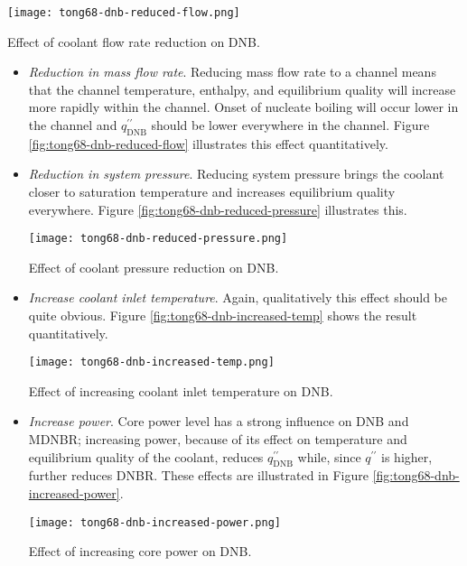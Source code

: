 \begin{marginfigure}
\texttt{[image: tong68-dnb-reduced-flow.png]}
\caption{Effect of coolant flow rate reduction on DNB.}
\label{fig:tong68-dnb-reduced-flow}
\end{marginfigure}
\begin{itemize}
\item \emph{Reduction in mass flow rate}.  Reducing mass flow rate to a channel means that the channel temperature, enthalpy, and equilibrium quality will increase more rapidly within the channel.  Onset of nucleate boiling will occur lower in the channel and $q^{\prime \prime}_{\text{DNB}}$ should be lower everywhere in the channel.  Figure \ref{fig:tong68-dnb-reduced-flow} illustrates this effect quantitatively.

\item \emph{Reduction in system pressure}.  Reducing system pressure brings the coolant closer to saturation temperature and increases equilibrium quality everywhere.  Figure \ref{fig:tong68-dnb-reduced-pressure} illustrates this.

\begin{marginfigure}
\texttt{[image: tong68-dnb-reduced-pressure.png]}
\caption{Effect of coolant pressure reduction on DNB.}
\label{fig:tong68-dnb-reduced-pressure}
\end{marginfigure}

\item \emph{Increase coolant inlet temperature}. Again, qualitatively this effect should be quite obvious.  Figure \ref{fig:tong68-dnb-increased-temp} shows the result quantitatively.

\begin{marginfigure}
\texttt{[image: tong68-dnb-increased-temp.png]}
\caption{Effect of increasing coolant inlet temperature on DNB.}
\label{fig:tong68-dnb-increased-temp}
\end{marginfigure}

\item \emph{Increase power}. Core power level has a strong influence on DNB and MDNBR; increasing power, because of its effect on temperature and equilibrium quality of the coolant, reduces $q^{\prime \prime}_{\text{DNB}}$ while, since $q^{\prime \prime}$ is higher, further reduces DNBR.  These effects are illustrated in Figure \ref{fig:tong68-dnb-increased-power}.

\begin{marginfigure}
\texttt{[image: tong68-dnb-increased-power.png]}
\caption{Effect of increasing core power on DNB.}
\label{fig:tong68-dnb-increased-power}
\end{marginfigure}

\end{itemize}

